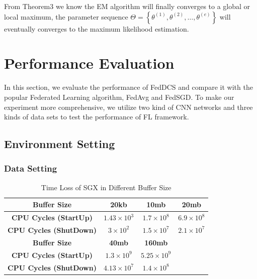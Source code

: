 \documentclass[conference]{IEEEtran}
\begin{document}
From Theorem3 we know the EM algorithm will finally converges 
to a global or local maximum, the parameter sequence 
$\Theta = \left\{\theta^{(1)},\theta^{(2)},\dots, \theta^{(e)}\right\}$ 
will eventually converges to the maximum likelihood estimation.
\section{Performance Evaluation}
In this section, we evaluate the performance of FedDCS and 
compare it with the popular Federated Learning algorithm, FedAvg and FedSGD. 
To make our experiment more comprehensive, we utilize two kind of CNN networks 
and three kinds of data sets to test the performance of FL framework.
\subsection{Environment Setting}
\subsubsection{Data Setting}
\begin{table}
    \caption{Time Loss of SGX in Different Buffer Size}
    \begin{tabular}{|c|c|c|l|}
    \hline
    \textbf{Buffer Size}           & \textbf{20kb}        & \textbf{10mb}        & \multicolumn{1}{c|}{\textbf{20mb}}       \\ \hline
    \textbf{CPU Cycles (StartUp)}  & $1.43 \times 10^{3}$ & $1.7 \times 10^{8}$  & \multicolumn{1}{c|}{$6.9 \times 10^{8}$} \\ \hline
    \textbf{CPU Cycles (ShutDown)} & $3 \times 10^{2}$    & $1.5 \times 10^{7}$  & \multicolumn{1}{c|}{$2.1 \times 10^{7}$} \\ \hline
    \textbf{Buffer Size}           & \textbf{40mb}        & \textbf{160mb}       &                                          \\ \hline
    \textbf{CPU Cycles (StartUp)}  & $1.3 \times 10^{9}$  & $5.25 \times 10^{9}$ &                                          \\ \hline
    \textbf{CPU Cycles (ShutDown)} & $4.13\times 10^{7}$  & $1.4 \times 10^{8}$  &                                          \\ \hline
    \end{tabular}
    \end{table}
    
\end{document}
